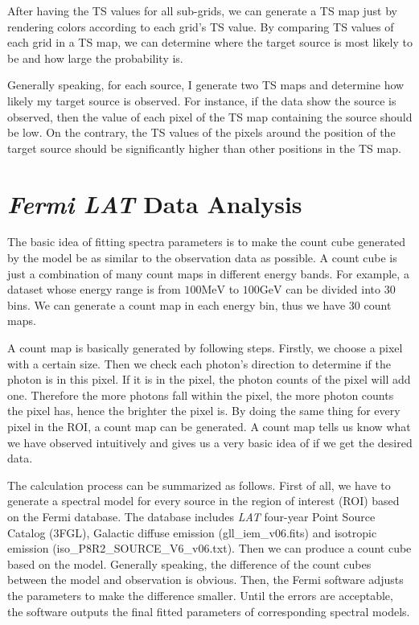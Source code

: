 \documentclass[12pt]{report}
\begin{document}
          After having the TS values for all sub-grids, we can generate a TS map just by 
          rendering colors according to each grid's TS value. By comparing TS values of 
          each grid in a TS map, we can determine where the target source is most likely to 
          be and how large the probability is. 
          
          Generally speaking, for each source, I generate two TS maps and determine how likely 
          my target source is observed. For instance, if the data show the source is observed, 
          then the value of each pixel of the TS map containing the source should be low. 
          On the contrary, the TS values of the pixels around the position of the target 
          source should be significantly higher than other positions in the TS map.
       
        \section{\textit{Fermi LAT} Data Analysis}
          The basic idea of fitting spectra parameters is to make the count cube generated by 
          the model be as similar to the observation data as possible. A count cube is just a 
          combination of many count maps in different energy bands. For example, a dataset whose 
          energy range is from $100\mbox{MeV}$ to $100\mbox{GeV}$ can be divided into 30 bins. 
          We can generate a count map in each energy bin, thus we have 30 count maps.
          
          A count map is basically generated by following steps. Firstly, we choose a 
          pixel with a certain size. Then we check each photon's direction to determine if 
          the photon is in this pixel. If it is in the pixel, the photon counts of the 
          pixel will add one. Therefore the more photons fall within the pixel, the more 
          photon counts the pixel has, hence the brighter the pixel is. By doing the same 
          thing for every pixel in the ROI, a count map can be generated. A count map tells 
          us know what we have observed intuitively and gives us a very basic idea of if 
          we get the desired data.
          
          The calculation process can be summarized as follows. First of all, we have to generate 
          a spectral model for every source in the region of interest (ROI) based on the Fermi 
          database. The database includes \textit{LAT} four-year Point Source Catalog (3FGL), 
          Galactic diffuse emission (gll\_iem\_v06.fits) and isotropic emission 
          (iso\_P8R2\_SOURCE\_V6\_v06.txt). Then we can produce a count cube based on the 
          model. Generally speaking, the difference of the count cubes between the model and 
          observation is obvious. Then, the Fermi software adjusts the parameters 
          to make the difference smaller. Until the errors are acceptable, the software 
          outputs the final fitted parameters of corresponding spectral models.    
\end{document}
